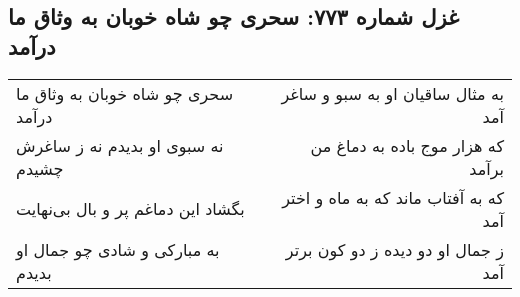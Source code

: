 \begin{center}
\section*{غزل شماره ۷۷۳: سحری چو شاه خوبان به وثاق ما درآمد}
\label{sec:0773}
\begin{longtable}{l p{0.5cm} r}
سحری چو شاه خوبان به وثاق ما درآمد
&&
به مثال ساقیان او به سبو و ساغر آمد
\\
نه سبوی او بدیدم نه ز ساغرش چشیدم
&&
که هزار موج باده به دماغ من برآمد
\\
بگشاد این دماغم پر و بال بی‌نهایت
&&
که به آفتاب ماند که به ماه و اختر آمد
\\
به مبارکی و شادی چو جمال او بدیدم
&&
ز جمال او دو دیده ز دو کون برتر آمد
\\
\end{longtable}
\end{center}
